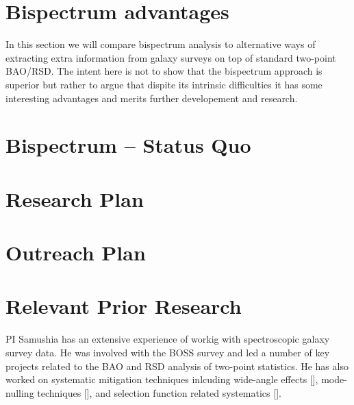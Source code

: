 \section{Bispectrum advantages}

In this section we will compare bispectrum analysis to alternative ways of
extracting extra information from galaxy surveys on top of standard two-point
BAO/RSD. The intent here is not to show that the bispectrum approach is
superior but rather to argue that dispite its intrinsic difficulties it has
some interesting advantages and merits further developement and research.






\section{Bispectrum -- Status Quo}

\section{Research Plan}

\section{Outreach Plan}





\section{Relevant Prior Research}

PI Samushia has an extensive experience of workig with
spectroscopic galaxy survey data. He was involved with the BOSS survey and led
a number of key projects related to the BAO and RSD analysis of two-point
statistics. He has also worked on systematic mitigation techniques inlcuding
wide-angle effects [], mode-nulling techniques [], and selection function
related systematics [].

